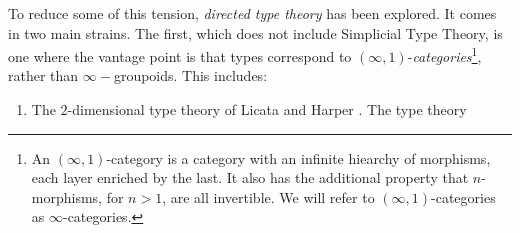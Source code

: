\documentclass[main.tex]{subfiles}
\begin{document}
To reduce some of this tension, \textit{directed type theory} has been explored. It comes in two main strains. The first, which does not include Simplicial Type Theory, is one where the vantage point is that types correspond to $(\infty,1)$-\textit{categories}\footnote{An $(\infty,1)$-category is a category with an infinite hiearchy of morphisms, each layer enriched by the last. It also has the additional property that $n$-morphisms, for $n>1$, are all invertible. We will refer to $(\infty,1)$-categories as $\infty$-categories.}, rather than $\infty-$groupoids. This includes:
\begin{enumerate}
  \item The $2$-dimensional type theory of Licata and Harper \cite{2DTT_Licata_Harper}. The type theory 
\end{enumerate}
\end{document}
